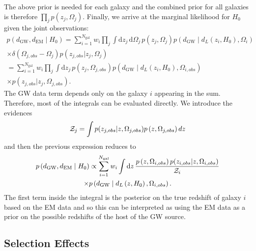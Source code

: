 \documentclass[modern]{article}
\newcommand{\dd}{\mathrm{d}}
\newcommand{\dEM}{d_{\mathrm{EM}}}
\newcommand{\dGW}{d_{\mathrm{GW}}}
\newcommand{\Ngal}{N_{\mathrm{gal}}}
\begin{document}
The above prior is needed for each galaxy and the combined prior for all galaxies is therefore $\prod_j p(z_j, \Omega_j)$. Finally, we arrive at the marginal likelihood for $H_0$ given the joint observations:
%
\begin{multline}
    p\left( \dGW, \dEM \mid H_0 \right) = \sum_{i=1}^{\Ngal} w_i \prod_j \int \dd z_j \, \dd \Omega_j \, p\left( z_j, \Omega_j \right) p\left( \dGW \mid d_L\left( z_i, H_0 \right), \Omega_i \right) \\ \times \delta(\Omega_{j,obs}-\Omega_j) p(z_{j,obs} | z_j, \Omega_j) \\
    = \sum_{i=1}^{\Ngal} w_i \prod_j \int \dd z_j \, p\left( z_j, \Omega_{j,obs} \right) p\left( \dGW \mid d_L\left( z_i, H_0 \right), \Omega_{i,obs} \right) \\ \times p(z_{j,obs} | z_j, \Omega_{j,obs}) .
\end{multline}
The GW data term depends only on the galaxy $i$ appearing in the sum. Therefore, most of the integrals can be evaluated directly. We introduce the evidences
\begin{equation}
{\cal Z}_j = \int p(z_{j,obs} | z, \Omega_{j,obs}) p\left( z, \Omega_{j,obs} \right) dz
\end{equation}
and then the previous expression reduces to
\begin{multline}
    \label{eq:H0-marginal-likelihood}
    p\left( \dGW, \dEM \mid H_0 \right) \propto  \sum_{i=1}^{\Ngal} w_i  \int \dd z \, \frac{p\left( z, \Omega_{i,obs} \right) p(z_{i,obs} | z, \Omega_{i,obs}) } {{\cal Z}_i} \\ \times p\left( \dGW \mid d_L\left( z, H_0 \right), \Omega_{i,obs} \right).
\end{multline}
The first term inside the integral is the posterior on the true redshift of galaxy $i$ based on the EM data and so this can be interpreted as using the EM data as a prior on the possible redshifts of the host of the GW source.

\subsection{Selection Effects}
\end{document}
